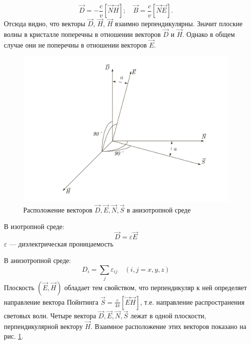 \documentclass[a4paper, 12pt]{article}
\begin{document}
	\begin{equation}
		\vec{D}=-\frac{c}{v}\left[\vec{N}\vec{H}\right];\quad\vec{B}=\frac{c}{v}\left[\vec{N}\vec{E}\right].
		\label{eq:2}
	\end{equation}
	Отсюда видно, что векторы $\vec{D}$, $\vec{H}$, $\vec{H}$ взаимно перпендикулярны. Значит плоские волны в кристалле поперечны в отношении векторов $\vec{D}$ и $\vec{H}$. Однако в общем случае они не поперечны в отношении векторов $\vec{E}$.\par
	\begin{figure}
		\includegraphics[scale=0.2]{DENS.pdf}
		\caption{Расположение векторов $\vec{D},\vec{E},\vec{N},\vec{S}$ в анизотропной среде}
		\label{fig:DENS}
	\end{figure}
	В изотропной среде: 
	\begin{equation}
		\vec{D}=\varepsilon\vec{E}
	\end{equation}
	$\varepsilon$ — диэлектрическая проницаемость\par
	В анизотропной среде:
	\begin{equation}
		D_i=\sum_{j}\varepsilon_{ij}\quad\left(i,j=x,y,z\right)
	\end{equation}
	Плоскость $\left(\vec{E},\vec{H}\right)$ обладает тем свойством, что перпендикуляр к ней определяет направление вектора Пойнтинга $\vec{S}=\frac{c}{4\pi}\left[\vec{E}\vec{H}\right]$, т.е. направление распространения световых волн. Четыре вектора $\vec{D},\vec{E},\vec{N},\vec{S}$ лежат в одной плоскости, перпендикулярной вектору $\vec{H}$. Взаимное расположение этих векторов показано на рис. \ref{fig:DENS}.
\end{document}
